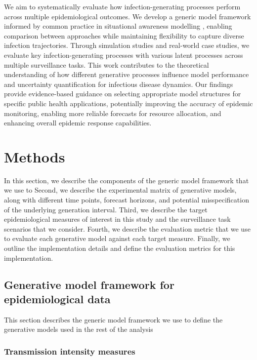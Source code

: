\documentclass{getwriting}
\begin{document}
We aim to systematically evaluate how infection-generating processes perform across multiple epidemiological outcomes. We develop a generic model framework informed by common practice in situational awareness modelling \cite{abbott2020epinow2, abbott2021epinowcast, scott2021epidemia, Cori2022}, enabling comparison between approaches while maintaining flexibility to capture diverse infection trajectories. Through simulation studies and real-world case studies, we evaluate key infection-generating processes with various latent processes across multiple surveillance tasks. This work contributes to the theoretical understanding of how different generative processes influence model performance and uncertainty quantification for infectious disease dynamics. Our findings provide evidence-based guidance on selecting appropriate model structures for specific public health applications, potentially improving the accuracy of epidemic monitoring, enabling more reliable forecasts for resource allocation, and enhancing overall epidemic response capabilities.

\section{Methods}

In this section, we describe the components of the generic model framework that we use to  Second, we describe the experimental matrix of generative models, along with different time points, forecast horizons, and potential misspecification of the underlying generation interval. Third, we describe the target epidemiological measures of interest in this study and the surveillance task scenarios that we consider. Fourth, we describe the evaluation metric that we use to evaluate each generative model against each target measure. Finally, we outline the implementation details and define the evaluation metrics for this implementation.

\subsection{Generative model framework for epidemiological data}
This section describes the generic model framework we use to define the generative models used in the rest of the analysis

\subsubsection{Transmission intensity measures}
\end{document}
